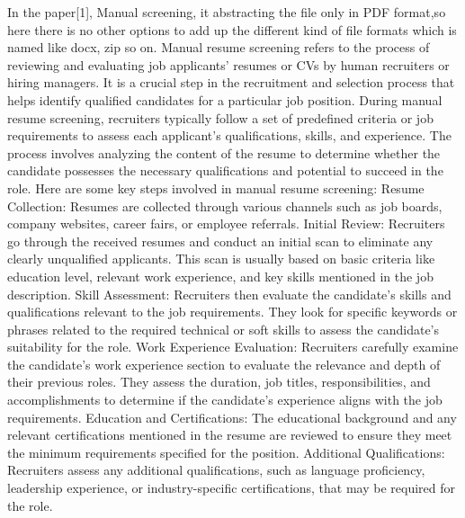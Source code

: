 \documentclass[12 pt, oneside]{book}
\begin{document}
\par In the paper[1], Manual screening, it abstracting the file only in PDF 
format,so here there is no other options to add up the different kind 
of file formats which is named like docx, zip so on. Manual resume screening refers to the process of reviewing and evaluating job applicants' 
resumes or CVs by human recruiters or hiring managers. It is a crucial step in the recruitment and selection process that helps identify qualified candidates for a particular job position.
During manual resume screening, recruiters typically follow a set of predefined criteria or job requirements to assess each applicant's qualifications, skills, and experience. The process involves analyzing the content of the resume to determine whether the candidate possesses the necessary qualifications and potential to succeed in the role.
Here are some key steps involved in manual resume screening:
\newline
Resume Collection: Resumes are collected through various channels such as job boards, company websites, career fairs, or employee referrals.
\newline
Initial Review: Recruiters go through the received resumes and conduct an initial scan to eliminate any clearly unqualified applicants. This scan is usually based on basic criteria like education level, relevant work experience, and key skills mentioned in the job description.
\newline
Skill Assessment: Recruiters then evaluate the candidate's skills and qualifications relevant to the job requirements. They look for specific keywords or phrases related to the required technical or soft skills to assess the candidate's suitability for the role.
\newline
Work Experience Evaluation: Recruiters carefully examine the candidate's work experience section to evaluate the relevance and depth of their previous roles. They assess the duration, job titles, responsibilities, and accomplishments to determine if the candidate's experience aligns with the job requirements.
\newline
Education and Certifications: The educational background and any relevant certifications mentioned in the resume are reviewed to ensure they meet the minimum requirements specified for the position.
\newline
Additional Qualifications: Recruiters assess any additional qualifications, such as language proficiency, leadership experience, or industry-specific certifications, that may be required for the role.
\end{document}
